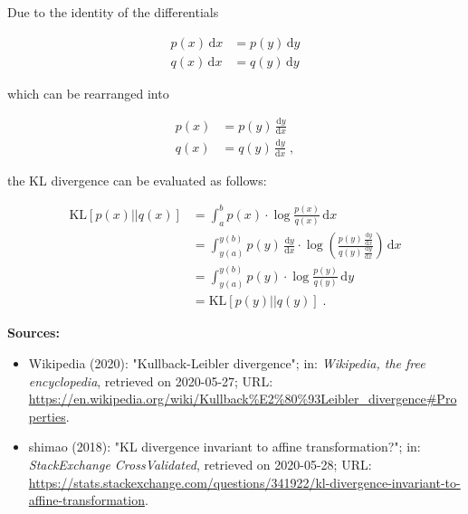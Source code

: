 \documentclass[a4paper,12pt,twoside]{book}
\begin{document}
Due to the identity of the differentials

\begin{equation} \label{eq:kl-inv-diff}
\begin{split}
p(x) \, \mathrm{d}x &= p(y) \, \mathrm{d}y \\
q(x) \, \mathrm{d}x &= q(y) \, \mathrm{d}y
\end{split}
\end{equation}

which can be rearranged into

\begin{equation} \label{eq:kl-inv-diff-dev}
\begin{split}
p(x) &= p(y) \, \frac{\mathrm{d}y}{\mathrm{d}x} \\
q(x) &= q(y) \, \frac{\mathrm{d}y}{\mathrm{d}x} \; ,
\end{split}
\end{equation}

the KL divergence can be evaluated as follows:

\begin{equation} \label{eq:kl-inv-MDE-DCE}
\begin{split}
\mathrm{KL}[p(x)||q(x)] &= \int_{a}^{b} p(x) \cdot \log \frac{p(x)}{q(x)} \, \mathrm{d}x \\
&= \int_{y(a)}^{y(b)} p(y) \, \frac{\mathrm{d}y}{\mathrm{d}x} \cdot \log \left( \frac{p(y) \, \frac{\mathrm{d}y}{\mathrm{d}x}}{q(y) \, \frac{\mathrm{d}y}{\mathrm{d}x}} \right) \, \mathrm{d}x \\
&= \int_{y(a)}^{y(b)} p(y) \cdot \log \frac{p(y)}{q(y)} \, \mathrm{d}y \\
&= \mathrm{KL}[p(y)||q(y)] \; .
\end{split}
\end{equation}


\vspace{1em}
\textbf{Sources:}
\begin{itemize}
\item Wikipedia (2020): "Kullback-Leibler divergence"; in: \textit{Wikipedia, the free encyclopedia}, retrieved on 2020-05-27; URL: \url{https://en.wikipedia.org/wiki/Kullback%E2%80%93Leibler_divergence#Properties}.
\item shimao (2018): "KL divergence invariant to affine transformation?"; in: \textit{StackExchange CrossValidated}, retrieved on 2020-05-28; URL: \url{https://stats.stackexchange.com/questions/341922/kl-divergence-invariant-to-affine-transformation}.
\end{itemize}
\end{document}

